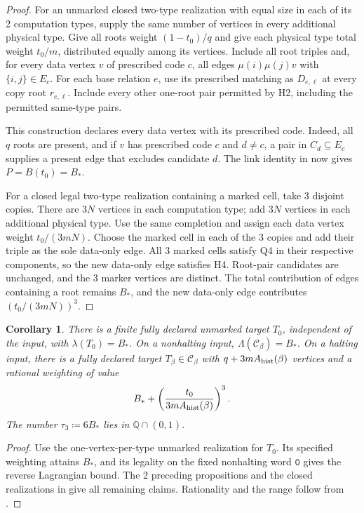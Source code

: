 \documentclass[10pt]{article}
\numberwithin{equation}{section}
\newtheorem{corollary}[corollary]{Corollary}\aliascntresetthe{corollary}
\theoremstyle{definition}
\begin{document}
\begin{proof}
For an unmarked closed two-type realization with equal size in each of its 2 computation types, supply the same number of vertices in every additional physical type. Give all roots weight $(1-t_0)/q$ and give each physical type total weight $t_0/m$, distributed equally among its vertices. Include all root triples and, for every data vertex $v$ of prescribed code $c$, all edges $\mu(i)\mu(j)v$ with $\{i,j\}\in E_c$. For each base relation $e$, use its prescribed matching as $D_{e,\ell}$ at every copy root $r_{e,\ell}$. Include every other one-root pair permitted by H2, including the permitted same-type pairs.

This construction declares every data vertex with its prescribed code. Indeed, all $q$ roots are present, and if $v$ has prescribed code $c$ and $d\ne c$, a pair in $C_d\subseteq E_c$ supplies a present edge that excludes candidate $d$. The link identity in  now gives $P=B(t_0)=B_*$.

For a closed legal two-type realization containing a marked cell, take 3 disjoint copies. There are $3N$ vertices in each computation type; add $3N$ vertices in each additional physical type. Use the same completion and assign each data vertex weight $t_0/(3mN)$. Choose the marked cell in each of the 3 copies and add their triple as the sole data-only edge. All 3 marked cells satisfy Q4 in their respective components, so the new data-only edge satisfies H4. Root-pair candidates are unchanged, and the 3 marker vertices are distinct. The total contribution of edges containing a root remains $B_*$, and the new data-only edge contributes $(t_0/(3mN))^3$.
\end{proof}
\begin{corollary}\label{thm:weighted-compiler}
There is a finite fully declared unmarked target $T_0$, independent of the input, with $\lambda(T_0)=B_*$. On a nonhalting input, $\Lambda(\mathcal C_\beta)=B_*$. On a halting input, there is a fully declared target $T_\beta\in\mathcal C_\beta$ with $q+3mA_{\rm hist}(\beta)$ vertices and a rational weighting of value
\[
 B_*+\left(\frac{t_0}{3mA_{\rm hist}(\beta)}\right)^3.
\]
The number $\tau_3\coloneqq6B_*$ lies in $\mathbb Q\cap(0,1)$.
\end{corollary}

\begin{proof}
Use the one-vertex-per-type unmarked realization for $T_0$. Its specified weighting attains $B_*$, and its legality on the fixed nonhalting word $\mathtt0$ gives the reverse Lagrangian bound. The 2 preceding propositions and the closed realizations in
 give all remaining
claims. Rationality and the range follow from .
\end{proof}
\end{document}
